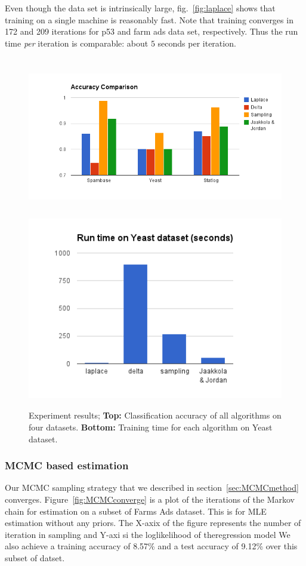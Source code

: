 Even though the data set is intrinsically large, fig.~\ref{fig:laplace} shows
that training on a single machine is reasonably fast. Note that training
converges in 172 and 209 iterations for p53 and farm ads data set,
respectively. Thus the run time {\em per} iteration is comparable: about $5$
seconds per iteration.


\begin{figure}[t]
\label{fig:laplace}
\centering
\includegraphics[height=7.0cm]{results/accuracy_comp.png}
\includegraphics[height=8.0cm]{results/speed_comp.png}

\caption{\small Experiment results; {\bf Top:} Classification accuracy of all algorithms on
four datasets. {\bf Bottom:} Training time for each algorithm on Yeast dataset. }

\label{graphlab}
\end{figure}

\subsubsection{MCMC based estimation}
Our MCMC sampling strategy that we described in section~\ref{sec:MCMCmethod}
converges. Figure~\ref{fig:MCMCconverge} is a plot of the iterations of the Markov 
chain for estimation on a subset of Farms Ads dataset. This is for MLE
estimation without any priors. The X-axix of the figure represents the number of
iteration in sampling and Y-axi si the loglikelihood of theregression model We
also achieve a training accuracy of 8.57\% and a test accuracy of 9.12\% over 
this subset of datset. 

